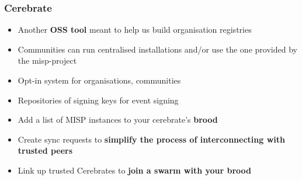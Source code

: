 \begin{frame}
  \frametitle{Cerebrate}
  \begin{itemize}
    \item Another {\bf OSS tool} meant to help us build organisation registries
    \item Communities can run centralised installations and/or use the one provided by the misp-project
    \item Opt-in system for organisations, communities
    \item Repositories of signing keys for event signing
    \item Add a list of MISP instances to your cerebrate's {\bf brood}
    \item Create sync requests to {\bf simplify the process of interconnecting with trusted peers}
    \item Link up trusted Cerebrates to {\bf join a swarm with your brood}
  \end{itemize}
\end{frame}

